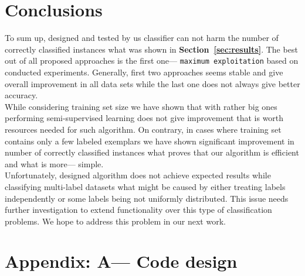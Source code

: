\documentclass[12pt, a4paper, pdflatex]{report}
\begin{document}
\section{Conclusions}
To sum up, designed and tested by us classifier can not harm the number of correctly classified instances what was shown in \textbf{Section~\ref{sec:results}}. The best out of all proposed approaches is the first one--- \texttt{maximum exploitation} based on conducted experiments. Generally, first two approaches seems stable and give overall improvement in all data sets while the last one does not always give better accuracy.\\

While considering training set size we have shown that with rather big  ones performing semi-supervised learning does not give improvement that is worth resources needed for such algorithm. On contrary, in cases where training set contains only a few labeled exemplars we have shown significant improvement in number of correctly classified instances what proves that our algorithm is efficient and what is more--- simple.\\

Unfortunately, designed algorithm does not achieve expected results while classifying multi-label datasets what might be caused by either treating labels independently or some labels being not uniformly distributed. This issue needs further investigation to extend functionality over this type of classification problems. We hope to address this problem in our next work.\\


\clearpage
\newpage
\section*{Appendix: A--- Code design\label{ap:code}}




{}
\end{document}
